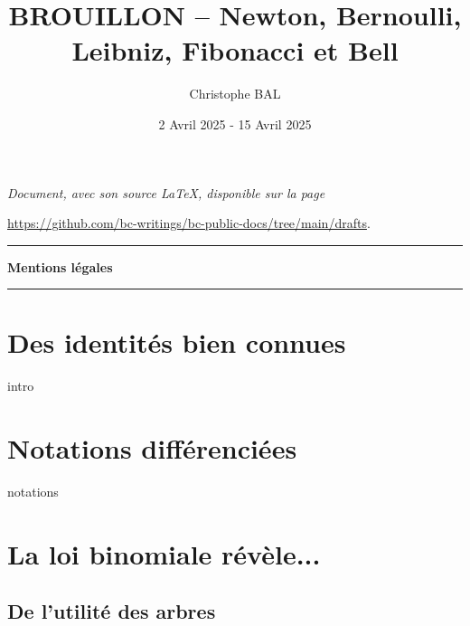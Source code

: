 \documentclass[12pt]{amsart}
\begin{document}
\title{BROUILLON -- Newton, Bernoulli, Leibniz, Fibonacci et Bell}
\author{Christophe BAL}
\date{2 Avril 2025 - 15 Avril 2025}

\maketitle

\begin{center}
	\itshape
	Document, avec son source \LaTeX, disponible sur la page

	\url{https://github.com/bc-writings/bc-public-docs/tree/main/drafts}.
\end{center}


\bigskip


\begin{center}
	\hrule\vspace{.3em}
	{
		\fontsize{1.35em}{1em}\selectfont
		\textbf{Mentions \og légales \fg}
	}

	\vspace{0.45em}
	\doclicenseThis
	\hrule
\end{center}


\bigskip


\setcounter{tocdepth}{2}
\tableofcontents




\newpage

\section{Des identités bien connues} \label{beautiful-id}

{intro}




\section{Notations différenciées}

{notations}




\section{La loi binomiale révèle...} \label{bino-implies}

    \subsection{De l'utilité des arbres} \label{useful-trees}
    
\end{document}
